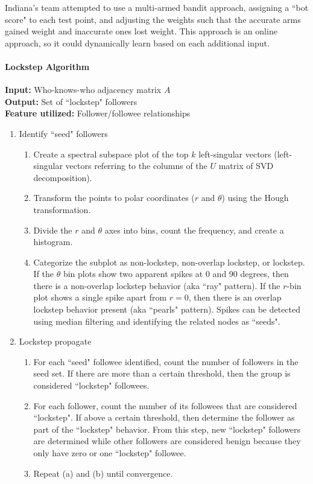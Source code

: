 \documentclass[11pt, oneside]{article}   	%
\begin{document}
\quad Indiana's team attempted to use a multi-armed bandit approach, assigning a ``bot score" to each test point, and adjusting the weights such that the accurate arms gained weight and inaccurate ones lost weight.
This approach is an online approach, so it could dynamically learn based on each additional input.

\paragraph{Lockstep Algorithm}
\quad

\textbf{Input:} Who-knows-who adjacency matrix $A$\\
\textbf{Output:} Set of ``lockstep" followers\\
\textbf{Feature utilized:} Follower/followee relationships

\begin{enumerate}
	\item Identify ``seed" followers
	\begin{enumerate}
		\item Create a spectral subspace plot of the top $k$ left-singular vectors (left-singular vectors referring to the columns of the $U$ matrix of SVD decomposition).
		\item Transform the points to polar coordinates ($r$ and $\theta$) using the Hough transformation.
		\item Divide the $r$ and $\theta$ axes into bins, count the frequency, and create a histogram.
		\item Categorize the subplot as non-lockstep, non-overlap lockstep, or lockstep.
		If the $\theta$ bin plots show two apparent spikes at 0 and 90 degrees, then there is a non-overlap lockstep behavior (aka ``ray" pattern).
		If the $r$-bin plot shows a single spike apart from $r = 0$, then there is an overlap lockstep behavior present (aka ``pearls" pattern).
		Spikes can be detected using median filtering and identifying the related nodes as ``seeds".
	\end{enumerate}
	\item Lockstep propagate
	\begin{enumerate}
		\item For each ``seed" followee identified, count the number of followers in the seed set.
		If there are more than a certain threshold, then the group is considered ``lockstep" followees.
		\item For each follower, count the number of its followees that are considered ``lockstep".
		If above a certain threshold, then determine the follower as part of the ``lockstep" behavior.
		From this step, new ``lockstep" followers are determined while other followers are considered benign because they only have zero or one ``lockstep" followee.
		\item Repeat (a) and (b) until convergence.
	\end{enumerate}
\end{enumerate}
\end{document}
